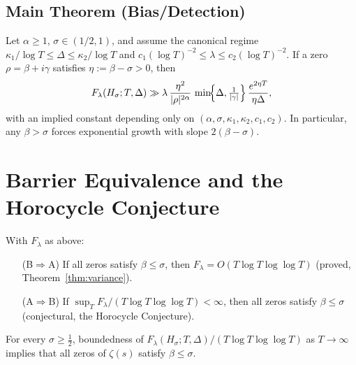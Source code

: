 \subsection{Main Theorem (Bias/Detection)}\label{subsec:bias-theorem}

\begin{theorem}\label{thm:bias}
Let $\alpha\ge1$, $\sigma\in(1/2,1)$, and assume the canonical regime
$\kappa_1/\log T \le \Delta \le \kappa_2/\log T$ and
$c_1(\log T)^{-2}\le \lambda \le c_2(\log T)^{-2}$.
If a zero $\rho=\beta+i\gamma$ satisfies $\eta:=\beta-\sigma>0$, then
\[
F_\lambda(H_\sigma;T,\Delta)
   \gg \lambda\,
       \frac{\eta^{2}}{|\rho|^{2\alpha}}\,
       \min\!\Bigl\{\Delta,\tfrac{1}{|\gamma|}\Bigr\}\,
       \frac{e^{2\eta T}}{\eta\Delta},
\]
with an implied constant depending only on
$(\alpha,\sigma,\kappa_1,\kappa_2,c_1,c_2)$.
In particular, any $\beta>\sigma$ forces exponential growth with slope $2(\beta-\sigma)$.
\end{theorem}

\section{Barrier Equivalence and the Horocycle Conjecture}\label{sec:barrier}

\begin{theorem}\label{thm:barrier}
With $F_\lambda$ as above:
\begin{enumerate}
\item[(B$\Rightarrow$A)] If all zeros satisfy $\beta\le\sigma$, then
$F_\lambda=O(T\log T\log\log T)$
(\textup{proved, Theorem~\ref{thm:variance}}).
\item[(A$\Rightarrow$B)] If $\sup_T F_\lambda/(T\log T\log\log T)<\infty$, then
all zeros satisfy $\beta\le\sigma$
(\textup{conjectural, the Horocycle Conjecture}).
\end{enumerate}
\end{theorem}

\begin{conjecture}\label{conj:horocycle}
For every $\sigma\ge\tfrac12$, boundedness of
$F_\lambda(H_\sigma;T,\Delta)/(T\log T\log\log T)$ as $T\to\infty$
implies that all zeros of $\zeta(s)$ satisfy $\beta\le\sigma$.
\end{conjecture}

